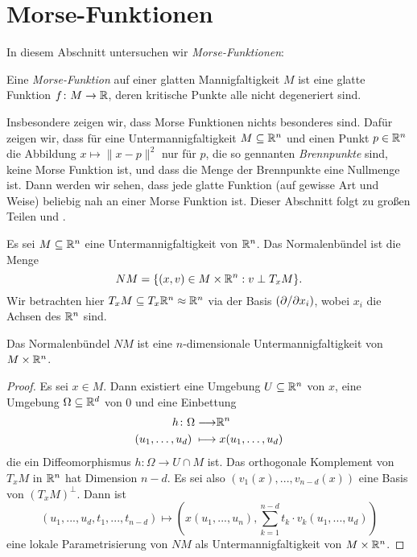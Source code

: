 \section{Morse-Funktionen}

In diesem Abschnitt untersuchen wir \textit{Morse-Funktionen}:

\begin{definition}
    \label{satz: morse-funktion}
    Eine \textit{Morse-Funktion} auf einer glatten Mannigfaltigkeit $M$ ist eine glatte Funktion
    $f \colon M \to { \mathbb R }$, deren kritische Punkte alle nicht degeneriert sind.
\end{definition}

Insbesondere zeigen wir, dass Morse Funktionen nichts besonderes sind. Dafür zeigen wir, dass für 
eine Untermannigfaltigkeit $M \subseteq { \mathbb R }^n$ und einen Punkt $p \in { \mathbb R }^n$ die Abbildung
$x \mapsto \| x - p \|^2$ nur für $p$, die so gennanten \textit{Brennpunkte}
sind, keine Morse Funktion ist, und dass die Menge der Brennpunkte eine Nullmenge ist. Dann werden
wir sehen, dass jede glatte Funktion (auf gewisse Art und Weise) beliebig nah an einer Morse 
Funktion ist. Dieser Abschnitt folgt zu großen Teilen \cite{milnor} und \cite{audin}.

\begin{definition}[Normalenbündel]
    \label{def: normalenbuendel}
    Es sei $M \subseteq { \mathbb R }^n$ eine Untermannigfaltigkeit von ${ \mathbb R }^n$. Das Normalenbündel ist die 
    Menge
    \[ NM = \{ (x, v) \in M \times { \mathbb R }^n : v \perp T_xM \} . \]
    Wir betrachten hier $T_xM \subseteq T_x{ \mathbb R }^n \approx { \mathbb R }^n$ via der Basis 
    $\left( { \partial } / { \partial } x_i \right)$, wobei $x_i$ die Achsen des ${ \mathbb R }^n$ sind.
\end{definition}

\begin{prop}
    \label{prop: NM ist untermannigfaltigkeit}
    Das Normalenbündel $NM$ ist eine $n$-dimensionale Untermannigfaltigkeit von $M \times { \mathbb R }^n$.
\end{prop}

\begin{proof}
    Es sei $x \in M$. Dann existiert eine Umgebung $U \subseteq { \mathbb R }^n$ von $x$, eine Umgebung 
    $\Omega \subseteq { \mathbb R }^d$ von $0$ und eine Einbettung 
    \begin{align*}
        h \colon \Omega \longrightarrow & { \mathbb R }^n \\
        (u_1, \dots, u_d) \; \longmapsto & \; x(u_1, \dots, u_d)
    \end{align*}
    die ein Diffeomorphismus $h \colon \Omega \to U \cap M$ ist. Das orthogonale Komplement 
    von $T_xM$ in ${ \mathbb R }^n$ hat Dimension $n - d$. Es sei also 
    $(v_1(x), ..., v_{n-d}(x))$ eine Basis von $(T_xM)^{\perp}$. Dann ist 
    \[ (u_1, ..., u_d, t_1, ..., t_{n - d}) \longmapsto 
        \left(x(u_1, ..., u_n), \sum_{k = 1}^{n - d} t_k \cdot v_k(u_1, ..., u_d)\right) \]
    eine lokale Parametrisierung von $NM$ als Untermannigfaltigkeit von $M \times { \mathbb R }^n$.
\end{proof}

